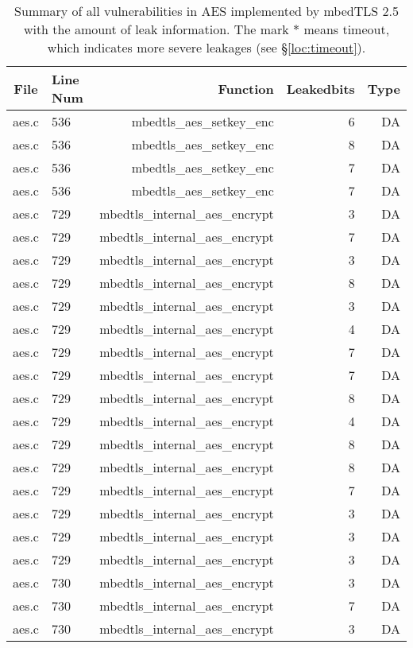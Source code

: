 \begin{table}%
\centering\tiny
\caption{Summary of all vulnerabilities in AES implemented by mbedTLS 2.5 with the amount of leak information. The mark $*$ means timeout, which indicates more severe leakages (see \S\ref{loc:timeout}).}\label{tab:AESmbedTLS}
\begin{tabular}{clrrr}
\hline
\textbf{File} & \textbf{Line Num} & \textbf{Function} & \textbf{Leakedbits} & \textbf{Type} \\\hline
aes.c& 536&mbedtls\_aes\_setkey\_enc&6 &DA\\
aes.c& 536&mbedtls\_aes\_setkey\_enc&8 &DA\\
aes.c& 536&mbedtls\_aes\_setkey\_enc&7 &DA\\
aes.c& 536&mbedtls\_aes\_setkey\_enc&7 &DA\\
aes.c& 729&mbedtls\_internal\_aes\_encrypt&3 &DA\\
aes.c& 729&mbedtls\_internal\_aes\_encrypt&7 &DA\\
aes.c& 729&mbedtls\_internal\_aes\_encrypt&3 &DA\\
aes.c& 729&mbedtls\_internal\_aes\_encrypt&8 &DA\\
aes.c& 729&mbedtls\_internal\_aes\_encrypt&3 &DA\\
aes.c& 729&mbedtls\_internal\_aes\_encrypt&4 &DA\\
aes.c& 729&mbedtls\_internal\_aes\_encrypt&7 &DA\\
aes.c& 729&mbedtls\_internal\_aes\_encrypt&7 &DA\\
aes.c& 729&mbedtls\_internal\_aes\_encrypt&8 &DA\\
aes.c& 729&mbedtls\_internal\_aes\_encrypt&4 &DA\\
aes.c& 729&mbedtls\_internal\_aes\_encrypt&8 &DA\\
aes.c& 729&mbedtls\_internal\_aes\_encrypt&8 &DA\\
aes.c& 729&mbedtls\_internal\_aes\_encrypt&7 &DA\\
aes.c& 729&mbedtls\_internal\_aes\_encrypt&3 &DA\\
aes.c& 729&mbedtls\_internal\_aes\_encrypt&3 &DA\\
aes.c& 729&mbedtls\_internal\_aes\_encrypt&3 &DA\\
aes.c& 730&mbedtls\_internal\_aes\_encrypt&3 &DA\\
aes.c& 730&mbedtls\_internal\_aes\_encrypt&7 &DA\\
aes.c& 730&mbedtls\_internal\_aes\_encrypt&3 &DA\\

\end{tabular}
\end{table}
